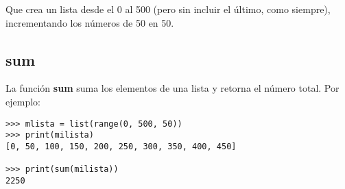 Que crea un lista desde el 0 al 500 (pero sin incluir el último, como siempre), incrementando los números de 50 en 50.

\subsection*{sum}

La función \textbf{sum} suma los elementos de una lista y retorna el número total.   Por ejemplo:

\begin{listing}
\begin{verbatim}
>>> mlista = list(range(0, 500, 50))
>>> print(milista)
[0, 50, 100, 150, 200, 250, 300, 350, 400, 450]

>>> print(sum(milista))
2250
\end{verbatim}
\end{listing}

\newpage
